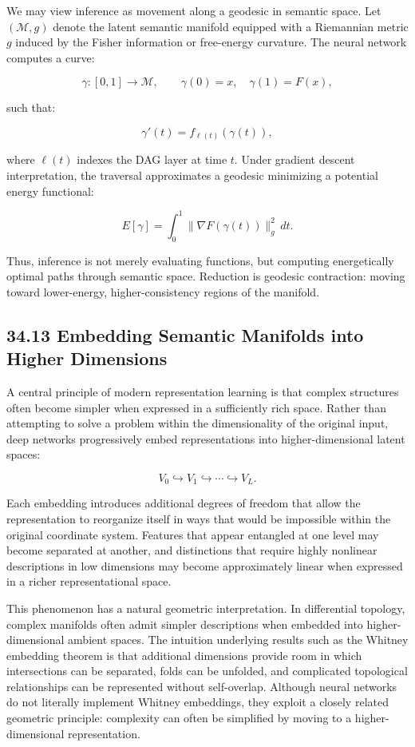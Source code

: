 \documentclass[12pt,letterpaper]{article}
\theoremstyle{remark}
\begin{document}
We may view inference as movement along a geodesic in semantic space. Let $(\mathcal{M}, g)$ denote the latent semantic manifold equipped with a Riemannian metric $g$ induced by the Fisher information or free-energy curvature. The neural network computes a curve:

\[
\gamma : [0,1] \to \mathcal{M}, \qquad \gamma(0) = x, \quad \gamma(1) = F(x),
\]

such that:

\[
\gamma'(t) = f_{\ell(t)}(\gamma(t)),
\]

where $\ell(t)$ indexes the DAG layer at time $t$. Under gradient descent interpretation, the traversal approximates a geodesic minimizing a potential energy functional:

\[
E[\gamma] = \int_0^1 \|\nabla F(\gamma(t))\|_g^2 \, dt.
\]

Thus, inference is not merely evaluating functions, but computing energetically optimal paths through semantic space.  
Reduction is geodesic contraction: moving toward lower-energy, higher-consistency regions of the manifold.

\subsection{34.13 Embedding Semantic Manifolds into Higher Dimensions}

A central principle of modern representation learning is that complex structures often become simpler when expressed in a sufficiently rich space. Rather than attempting to solve a problem within the dimensionality of the original input, deep networks progressively embed representations into higher-dimensional latent spaces:

\[
V_0 \hookrightarrow V_1 \hookrightarrow \cdots \hookrightarrow V_L.
\]

Each embedding introduces additional degrees of freedom that allow the representation to reorganize itself in ways that would be impossible within the original coordinate system. Features that appear entangled at one level may become separated at another, and distinctions that require highly nonlinear descriptions in low dimensions may become approximately linear when expressed in a richer representational space.

This phenomenon has a natural geometric interpretation. In differential topology, complex manifolds often admit simpler descriptions when embedded into higher-dimensional ambient spaces. The intuition underlying results such as the Whitney embedding theorem is that additional dimensions provide room in which intersections can be separated, folds can be unfolded, and complicated topological relationships can be represented without self-overlap. Although neural networks do not literally implement Whitney embeddings, they exploit a closely related geometric principle: complexity can often be simplified by moving to a higher-dimensional representation.
\end{document}
